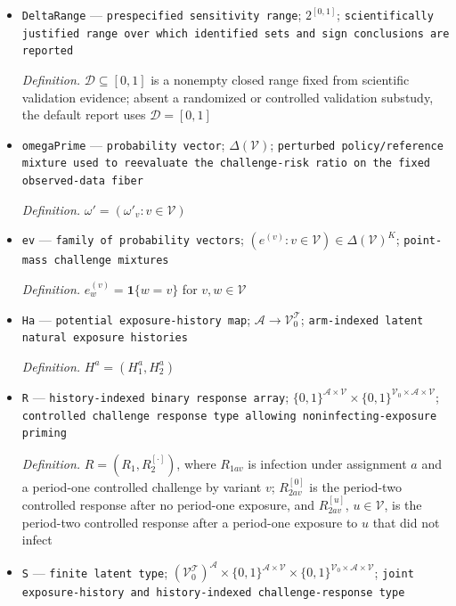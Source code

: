 \documentclass{article}
\begin{document}
\begin{itemize}
  \item \texttt{DeltaRange} --- \texttt{prespecified sensitivity range}; \(2^{[0,1]}\); \texttt{scientifically justified range over which identified sets and sign conclusions are reported}
  \par\smallskip\noindent\emph{Definition.} \(\mathcal D\subseteq[0,1]\) is a nonempty closed range fixed from scientific validation evidence; absent a randomized or controlled validation substudy, the default report uses \(\mathcal D=[0,1]\)
  \item \texttt{omegaPrime} --- \texttt{probability vector}; \(\Delta(\mathcal V)\); \texttt{perturbed policy/\allowbreak{}reference mixture used to reevaluate the challenge-\allowbreak{}risk ratio on the fixed observed-\allowbreak{}data fiber}
  \par\smallskip\noindent\emph{Definition.} \(\omega'=(\omega'_v:v\in\mathcal V)\)
  \item \texttt{ev} --- \texttt{family of probability vectors}; \((e^{(v)}:v\in\mathcal V)\in\Delta(\mathcal V)^K\); \texttt{point-\allowbreak{}mass challenge mixtures}
  \par\smallskip\noindent\emph{Definition.} \(e^{(v)}_w=\mathbf 1\{w=v\}\) for \(v,w\in\mathcal V\)
  \item \texttt{Ha} --- \texttt{potential exposure-\allowbreak{}history map}; \(\mathcal A\to\mathcal V_0^{\mathcal T}\); \texttt{arm-\allowbreak{}indexed latent natural exposure histories}
  \par\smallskip\noindent\emph{Definition.} \(H^a=(H_1^a,H_2^a)\)
  \item \texttt{R} --- \texttt{history-\allowbreak{}indexed binary response array}; \(\{0,1\}^{\mathcal A\times\mathcal V}\times\{0,1\}^{\mathcal V_0\times\mathcal A\times\mathcal V}\); \texttt{controlled challenge response type allowing noninfecting-\allowbreak{}exposure priming}
  \par\smallskip\noindent\emph{Definition.} \(R=(R_1,R_2^{[\cdot]})\), where \(R_{1av}\) is infection under assignment \(a\) and a period-one controlled challenge by variant \(v\); \(R^{[0]}_{2av}\) is the period-two controlled response after no period-one exposure, and \(R^{[u]}_{2av}\), \(u\in\mathcal V\), is the period-two controlled response after a period-one exposure to \(u\) that did not infect
  \item \texttt{S} --- \texttt{finite latent type}; \((\mathcal V_0^{\mathcal T})^{\mathcal A}\times\{0,1\}^{\mathcal A\times\mathcal V}\times\{0,1\}^{\mathcal V_0\times\mathcal A\times\mathcal V}\); \texttt{joint exposure-\allowbreak{}history and history-\allowbreak{}indexed challenge-\allowbreak{}response type}

\end{itemize}
\end{document}
